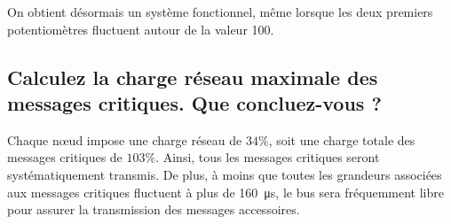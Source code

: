 \documentclass[12pt]{article}
\begin{document}
On obtient désormais un système fonctionnel, même lorsque les deux premiers potentiomètres fluctuent autour de la valeur 100.

\subsection{Calculez la charge réseau maximale des messages critiques. Que concluez-vous ?}

Chaque nœud impose une charge réseau de $34\%$, soit une charge totale des messages critiques de $103\%$. Ainsi, tous les messages critiques seront systématiquement transmis. De plus, à moins que toutes les grandeurs associées aux messages critiques fluctuent à plus de \SI{160}{\micro\second}, le bus sera fréquemment libre pour assurer la transmission des messages accessoires.
\end{document}
